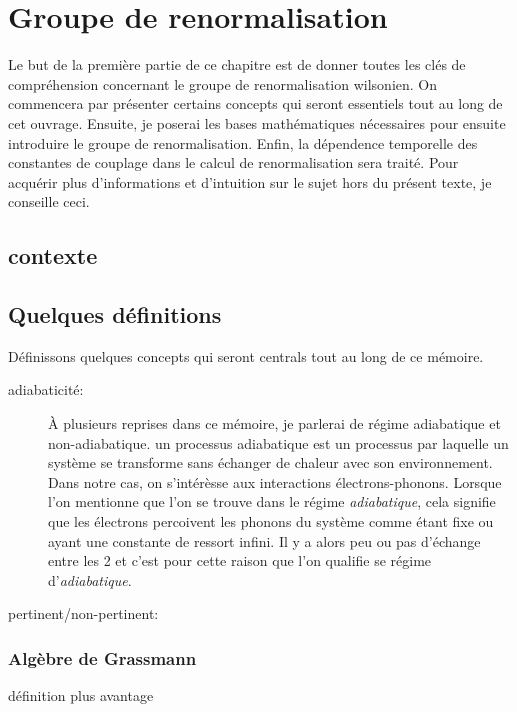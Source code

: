 \chapter{Groupe de renormalisation}
\begin{Abstract}
    \begin{changemargin}{2cm}{2cm}
    Le but de la première partie de ce chapitre est de donner toutes les clés
    de compréhension concernant le groupe de renormalisation wilsonien. On
    commencera par présenter certains concepts qui seront essentiels tout
    au long de cet ouvrage. Ensuite, je poserai les bases mathématiques
    nécessaires pour ensuite introduire le groupe de renormalisation. Enfin,
    la dépendence temporelle des constantes de couplage dans le calcul de
    renormalisation sera traité. Pour acquérir plus d'informations et
    d'intuition sur le sujet hors du présent texte, je conseille
    ceci\cite{ma-introduction-1973}.
    \end{changemargin}
\end{Abstract}

\section{contexte}

\section{Quelques définitions}
Définissons quelques concepts qui seront centrals tout au long de ce mémoire.
\begin{description}
    \item[adiabaticité:] À plusieurs reprises dans ce mémoire, je parlerai
    de régime adiabatique et non-adiabatique. un processus adiabatique
    est un processus par laquelle un système se transforme sans échanger
    de chaleur avec son environnement. Dans notre cas, on s'intérèsse aux
    interactions électrons-phonons. Lorsque l'on mentionne que l'on se trouve
    dans le régime \textit{adiabatique}, cela signifie que les électrons
    percoivent les phonons du système comme étant fixe ou ayant une constante
    de ressort infini. Il y a alors peu ou pas d'échange entre les 2 et c'est
    pour cette raison que l'on qualifie se régime d'\textit{adiabatique}.
    \item[pertinent/non-pertinent: ]
\end{description}

\subsection{Algèbre de Grassmann}
définition plus avantage

